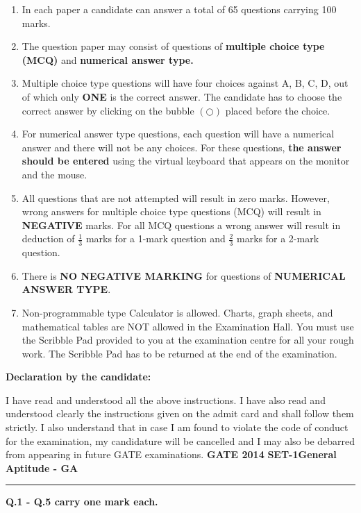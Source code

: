 \documentclass[a4paper,10pt]{exam}
\theoremstyle{remark}
\begin{document}
\begin{enumerate}
    \item In each paper a candidate can answer a total of 65 questions carrying 100 marks.
    \item The question paper may consist of questions of \textbf{multiple choice type (MCQ)} and \textbf{numerical answer type.}
    \item Multiple choice type questions will have four choices against A, B, C, D, out of which only \textbf{ONE} is the correct answer. The candidate has to choose the correct answer by clicking on the bubble $(\bigcirc)$ placed before the choice.
    \item For numerical answer type questions, each question will have a numerical answer and there will not be any choices. For these questions, \textbf{the answer should be entered} using the virtual keyboard that appears on the monitor and the mouse.
    \item All questions that are not attempted will result in zero marks. However, wrong answers for multiple choice type questions (MCQ) will result in \textbf{NEGATIVE} marks. For all MCQ questions a wrong answer will result in deduction of $\frac{1}{3}$ marks for a 1-mark question and $\frac{2}{3}$ marks for a 2-mark question.
    \item There is \textbf{NO NEGATIVE MARKING} for questions of \textbf{NUMERICAL ANSWER TYPE}.
    \item Non-programmable type Calculator is allowed. Charts, graph sheets, and mathematical tables are NOT allowed in the Examination Hall. You must use the Scribble Pad provided to you at the examination centre for all your rough work. The Scribble Pad has to be returned at the end of the examination.
\end{enumerate}

\vspace{6mm}
\textbf{Declaration by the candidate:}

\noindent I have read and understood all the above instructions. I have also read and understood clearly the instructions given on the admit card and shall follow them strictly. I also understand that in case I am found to violate the code of conduct for the examination, my candidature will be cancelled and I may also be debarred from appearing in future GATE examinations.
\newpage
\textbf{GATE 2014}\hspace{1in} \textbf{SET-1}\hfill \textbf{General Aptitude - GA}\\
\noindent\rule{\linewidth}{0.4pt}
\textbf{Q.1 - Q.5 carry one mark each.}
\end{document}
